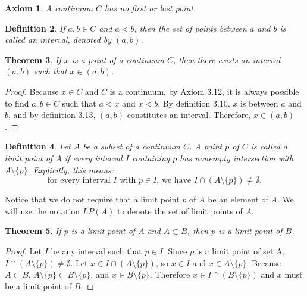 \documentclass{amsart}
\newtheorem{theorem}{Theorem}
\newtheorem{axiom}[theorem]{Axiom}
\newtheorem{definition}[theorem]{Definition}
\newcommand{\1}{\mathds{1}}
\numberwithin{equation}{section}
\numberwithin{theorem}{section}
\begin{document}
\begin{axiom} A continuum $C$ has no first or last point.
\end{axiom}

\begin{definition} If $a,b\in C$ and $a < b$, then the set of points between $a$ and $b$ is called an \emph{interval}, denoted by $(a,b)$.  
\end{definition}



\begin{theorem}
	If $x$ is a point of a continuum $C$, then there exists an interval $(a,b)$ such that $x \in (a,b)$.
\end{theorem}

\begin{proof}
	Because $x\in C$ and $C$ is a continuum, by Axiom 3.12, it is always possible to find $a,b\in C$ such that $a<x$ and $x<b$. By definition 3.10, $x$ is between $a$ and $b$, and by definition 3.13, $(a,b)$ constitutes an interval. Therefore, $x\in (a,b)$.
\end{proof}

\begin{definition}
	Let $A$ be a subset of a continuum $C$.  A point $p$ of $C$ is called a \emph{limit point} of $A$ if every interval $I$ containing $p$ has nonempty intersection with $A \setminus \{p\}$.  Explicitly, this means:
	\[
	\text{for every interval $I$ with $p \in I$, we have $I \cap (A \setminus \{p \}) \neq \emptyset$.}
	\]
\end{definition}

Notice that we do not require that a limit point $p$ of $A$ be an element of $A$. We will use the notation $LP(A)$ to denote the set of limit points of $A.$ 

\begin{theorem} If $p$ is a limit point of $A$ and $A \subset B$, then $p$ is a limit point of $B$.
\end{theorem}

\begin{proof}
	Let $I$ be any interval such that $p\in I$. Since $p$ is a limit point of set A, $I \cap (A \setminus \{p \}) \neq \emptyset$. Let $x\in I \cap (A \setminus \{p \})$, so $x\in I$ and $x\in A \setminus \{p\}$. Because $A\subset B$, $A\setminus \{p\}\subset B\setminus\{p\}$, and $x\in B\setminus \{p\}$. Therefore $x\in I \cap (B \setminus \{p \})$ and $x$ must be a limit point of $B$.
\end{proof}
\end{document}
